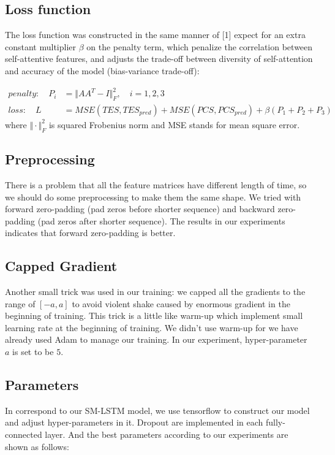 \documentclass{article}
\begin{document}
\subsection{Loss function}
The loss function was constructed in the same manner of [1] expect for an extra constant multiplier $\beta$ on the penalty term, which penalize the correlation between self-attentive features, and adjusts the trade-off between diversity of self-attention and accuracy of the model (bias-variance trade-off):

\begin{align}
penalty:\quad P_i&=\Vert AA^T-I \Vert_F^2,\quad i=1,2,3\\
loss:\quad L&=MSE(TES, TES_{pred})+MSE(PCS, PCS_{pred})+\beta(P_1+P_2+P_3)
\end{align}
where $\Vert\cdot\Vert_F^2$ is squared Frobenius norm and MSE stands for mean square error.

\subsection{Preprocessing}
There is a problem that all the feature matrices have different length of time, so we should do some preprocessing to make them the same shape. We tried with forward zero-padding (pad zeros before shorter sequence) and backward zero-padding (pad zeros after shorter sequence). The results in our experiments indicates that forward zero-padding is better.

\subsection{Capped Gradient}
Another small trick was used in our training: we capped all the gradients to the range of $[-a,a]$ to avoid violent shake caused by enormous gradient in the beginning of training. This trick is a little like warm-up which implement small learning rate at the beginning of training. We didn't use warm-up for we have already used Adam to manage our training. In our experiment, hyper-parameter $a$ is set to be $5$.


\subsection{Parameters}
In correspond to our SM-LSTM model, we use tensorflow to construct our model and adjust hyper-parameters in it. Dropout are implemented in each fully-connected layer. And the best parameters according to our experiments are shown as follows:
\end{document}
